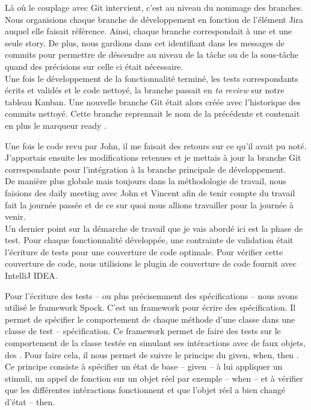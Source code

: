 Là où le couplage avec Git intervient, c'est au niveau du nommage des branches.
Nous organisions chaque branche de développement en fonction de l'élément Jira
auquel elle faisait référence. Ainsi, chaque branche correspondait à une et une
seule story. De plus, nous gardions dans cet identifiant dans les messages de
commits pour permettre de déscendre au niveau de la tâche ou de la sous-tâche
quand des précisions sur celle ci était nécessaire.\\

Une fois le développement de la fonctionnalité terminé, les tests correspondants
écrits et validés et le code nettoyé, la branche passait en {\em \og to review
\fg{} } sur notre tableau Kanban. Une nouvelle branche Git était alors créée
avec l'historique des commits nettoyé. Cette branche reprennait le nom de la
précédente et contenait en plus le marqueur \og ready \fg{}.

Une fois le code revu par John, il me faisait des retours sur ce qu'il avait pu
noté. J'apportais ensuite les modifications retenues et je mettais à jour la
branche Git correspondante pour l'intégration à la branche principale de
développement.\\

De manière plus globale mais toujours dans la méthodologie de travail, nous
faisions des \og daily meeting \fg{} avec John et Vincent afin de tenir compte du
travail fait la journée passée et de ce sur quoi nous allions travailler pour la
journée à venir.\\

Un dernier point sur la démarche de travail que je vais abordé ici est la phase
de test. Pour chaque fonctionnalité développée, une contrainte de validation
était l'écriture de tests pour une couverture de code optimale. Pour vérifier
cette couverture de code, nous utilisions le plugin de couverture de code
fournit avec IntelliJ IDEA.

Pour l'écriture des tests -- ou plus précisemment des spécifications -- nous
avons utilisé le framework Spock. C'est un framework pour écrire des
spécification. Il permet de spécifier le comportement de chaque méthode d'une
classe dans une classe de test -- spécification. Ce framework permet de faire
des tests sur le comportement de la classe testée en simulant ses intéractions
avec de faux objets, des . Pour faire cela, il nous permet de suivre
le principe du \og given, when, then \fg{}. Ce principe consiste à spécifier un
état de base -- given -- à lui appliquer un stimuli, un appel de fonction sur un
objet réel par exemple -- when -- et à vérifier que les différentes
intéractions fonctionnent et que l'objet réel a bien changé d'état -- then.


